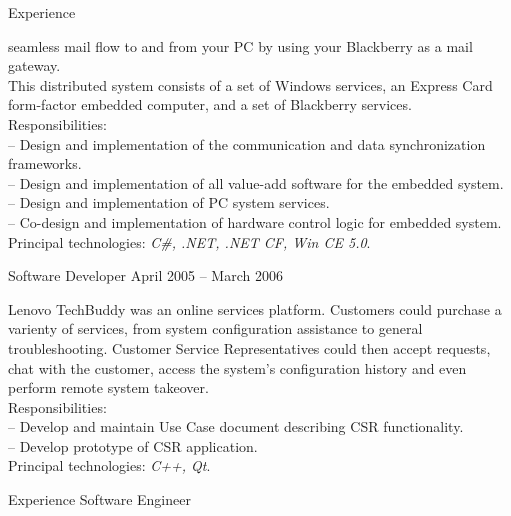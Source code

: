 \documentclass[letterpaper, 11pt]{article}
\begin{document}
\begin{resume}
\begin{category}{Experience}
\begin{block}
                seamless mail flow to and from your PC by using your Blackberry as a mail
                gateway.
                \\[1ex]
                This distributed system consists of a set of Windows services, an Express Card
                form-factor embedded computer, and a set of Blackberry services.
                \\[1ex]
                Responsibilities: \\
                -- Design and implementation of the communication and data synchronization frameworks. \\
                -- Design and implementation of all value-add software for the embedded system. \\
                -- Design and implementation of PC system services. \\
                -- Co-design and implementation of hardware control logic for embedded system.
                \\[1ex]
                Principal technologies: \emph{C\#, .NET, .NET CF, Win CE 5.0}.
                \smallskip
            \end{block}
            \begin{block}
                 {Software Developer}
                         { }                {April 2005 -- March 2006}
                \par
                Lenovo TechBuddy was an online services platform.  Customers could purchase
                a varienty of services, from system configuration assistance to general
                troubleshooting.  Customer Service Representatives could then accept requests,
                chat with the customer, access the system's configuration history and even
                perform remote system takeover.
                \\[1ex]
                Responsibilities: \\
                -- Develop and maintain Use Case document describing CSR functionality. \\
                -- Develop prototype of CSR application.
                \\[1ex]
                Principal technologies: \emph{C++, Qt}.
            \end{block}
        \end{category}
        \begin{category}{Experience}
                                                         {Software Engineer}

\end{category}
\end{resume}
\end{document}
